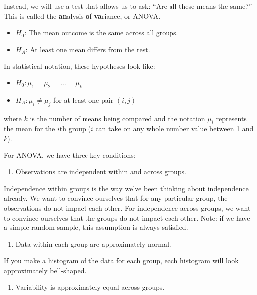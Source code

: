 \documentclass[
]{book}
\providecommand{\tightlist}{%
  \setlength{\itemsep}{0pt}\setlength{\parskip}{0pt}}
\begin{document}
Instead, we will use a test that allows us to ask: ``Are all these means the same?'' This is called the \textbf{an}alysis \textbf{o}f \textbf{va}riance, or ANOVA.

\begin{itemize}
\tightlist
\item
  \(H_0\): The mean outcome is the same across all groups.
\item
  \(H_A\): At least one mean differs from the rest.
\end{itemize}

In statistical notation, these hypotheses look like:

\begin{itemize}
\tightlist
\item
  \(H_0: \mu_1 = \mu_2 = \dots = \mu_k\)
\item
  \(H_A: \mu_i \ne \mu_j\) for at least one pair \((i, j)\)
\end{itemize}

where \(k\) is the number of means being compared and the notation \(\mu_i\) represents the mean for the \(i\)th group (\(i\) can take on any whole number value between 1 and \(k\)).

For ANOVA, we have three key conditions:

\begin{enumerate}
\def\labelenumi{\arabic{enumi}.}
\tightlist
\item
  Observations are independent within and across groups.
\end{enumerate}

Independence within groups is the way we've been thinking about independence already. We want to convince ourselves that for any particular group, the observations do not impact each other. For independence across groups, we want to convince ourselves that the groups do not impact each other. Note: if we have a simple random sample, this assumption is always satisfied.

\begin{enumerate}
\def\labelenumi{\arabic{enumi}.}
\setcounter{enumi}{1}
\tightlist
\item
  Data within each group are approximately normal.
\end{enumerate}

If you make a histogram of the data for each group, each histogram will look approximately bell-shaped.

\begin{enumerate}
\def\labelenumi{\arabic{enumi}.}
\setcounter{enumi}{2}
\tightlist
\item
  Variability is approximately equal across groups.
\end{enumerate}
\end{document}
